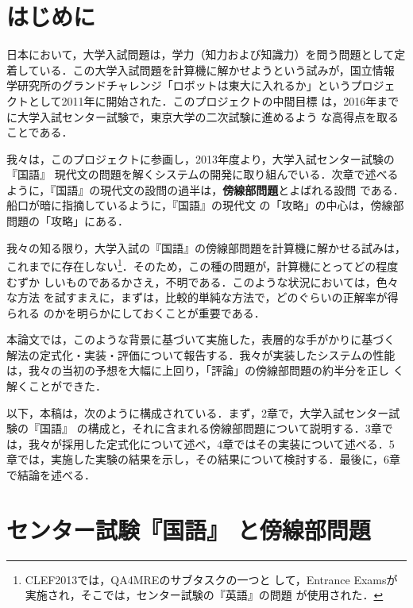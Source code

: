 \documentclass[japanese]{jnlp_1.4}
\begin{document}
\maketitle


\section{はじめに}

日本において，大学入試問題は，学力（知力および知識力）を問う問題として定
着している．この大学入試問題を計算機に解かせようという試みが，国立情報
学研究所のグランドチャレンジ「ロボットは東大に入れるか」というプロジェ
クトとして2011年に開始された\cite{Arai2012}．このプロジェクトの中間目標
は，2016年までに大学入試センター試験で，東京大学の二次試験に進めるよう
な高得点を取ることである．

我々は，このプロジェクトに参画し，2013年度より，大学入試センター試験の
『国語』 現代文の問題を解くシステムの開発に取り組んでいる．次章で述べる
ように，『国語』の現代文の設問の過半は，{\bf 傍線部問題}とよばれる設問
である．船口\cite{Funaguchi}が暗に指摘しているように，『国語』の現代文
の「攻略」の中心は，傍線部問題の「攻略」にある．

我々の知る限り，大学入試の『国語』の傍線部問題を計算機に解かせる試みは，
これまでに存在しない\footnote{CLEF2013では，QA4MREのサブタスクの一つと
して，Entrance Examsが実施され，そこでは，センター試験の『英語』の問題
が使用された．}．そのため，この種の問題が，計算機にとってどの程度むずか
しいものであるかさえ，不明である．このような状況においては，色々な方法
を試すまえに，まずは，比較的単純な方法で，どのぐらいの正解率が得られる
のかを明らかにしておくことが重要である．

本論文では，このような背景に基づいて実施した，表層的な手がかりに基づく
解法の定式化・実装・評価について報告する．我々が実装したシステムの性能
は，我々の当初の予想を大幅に上回り，「評論」の傍線部問題の約半分を正し
く解くことができた．

以下，本稿は，次のように構成されている．まず，2章で，大学入試センター試
験の『国語』 の構成と，それに含まれる傍線部問題について説明する．3章で
は，我々が採用した定式化について述べ，4章ではその実装について述べる．5
章では，実施した実験の結果を示し，その結果について検討する．最後に，6章
で結論を述べる．


\section{センター試験『国語』 と傍線部問題}
\end{document}
